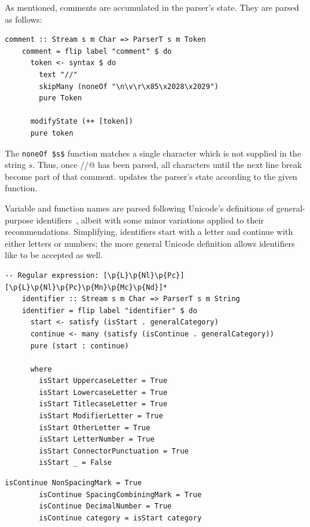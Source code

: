 \documentclass[UdineBachThesis,american,11pt]{PhdThesis}
\begin{document}
  As mentioned, comments are accumulated in the parser's state. They are parsed
  as follows:

  \begin{lstlisting}[gobble=4,basicstyle=\ttfamily\small]
    comment :: Stream s m Char => ParserT s m Token
    comment = flip label "comment" $ do
      token <- syntax $ do
        text "//"
        skipMany (noneOf "\n\v\r\x85\x2028\x2029")
        pure Token

      modifyState (++ [token])
      pure token
  \end{lstlisting}

  The \lstinline[mathescape]@noneOf $s$@ function matches a single character
  which is not supplied in the string $s$. Thus, once \lstinline@//@ has been
  parsed, all characters until the next line break become part of that comment.
  \lstinline@modifyState@ updates the parser's state according to the given
  function.

  Variable and function names are parsed following Unicode's definitions of
  general-purpose identifiers~\cite{identifier-syntax}, albeit with some minor
  variations applied to their recommendations. Simplifying, identifiers start
  with a letter and continue with either letters or numbers; the more general
  Unicode definition allows identifiers like \texttt{} to
  be accepted as well.

  \begin{lstlisting}[gobble=4,basicstyle=\ttfamily\small]
    -- Regular expression: [\p{L}\p{Nl}\p{Pc}][\p{L}\p{Nl}\p{Pc}\p{Mn}\p{Mc}\p{Nd}]*
    identifier :: Stream s m Char => ParserT s m String
    identifier = flip label "identifier" $ do
      start <- satisfy (isStart . generalCategory)
      continue <- many (satisfy (isContinue . generalCategory))
      pure (start : continue)

      where
        isStart UppercaseLetter = True
        isStart LowercaseLetter = True
        isStart TitlecaseLetter = True
        isStart ModifierLetter = True
        isStart OtherLetter = True
        isStart LetterNumber = True
        isStart ConnectorPunctuation = True
        isStart _ = False
  \end{lstlisting}

  \newpage

  \begin{lstlisting}[gobble=4,basicstyle=\ttfamily\small]
        isContinue NonSpacingMark = True
        isContinue SpacingCombiningMark = True
        isContinue DecimalNumber = True
        isContinue category = isStart category
  \end{lstlisting}
\end{document}
